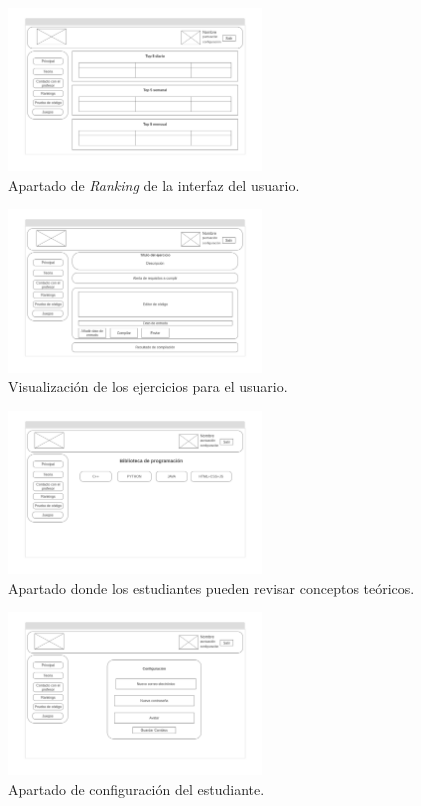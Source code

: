 \begin{figure}[H]
    \centering
    \includegraphics[width=0.6\textwidth]{imagenes/Mockups/7-Ranking.png}
    \caption{Apartado de \textit{Ranking} de la interfaz del usuario.}
\end{figure}


\begin{figure}[H]
    \centering
    \includegraphics[width=0.6\textwidth]{imagenes/Mockups/8-Ejercicio.png}
    \caption{Visualización de los ejercicios para el usuario.}
\end{figure}

\begin{figure}[H]
    \centering
    \includegraphics[width=0.6\textwidth]{imagenes/Mockups/9-Consulta-Teoria.png}
    \caption{Apartado donde los estudiantes pueden revisar conceptos teóricos.}
\end{figure}

\begin{figure}[H]
    \centering
    \includegraphics[width=0.6\textwidth]{imagenes/Mockups/10-Configuracion-Est-.png}
    \caption{Apartado de configuración del estudiante.}
\end{figure}

